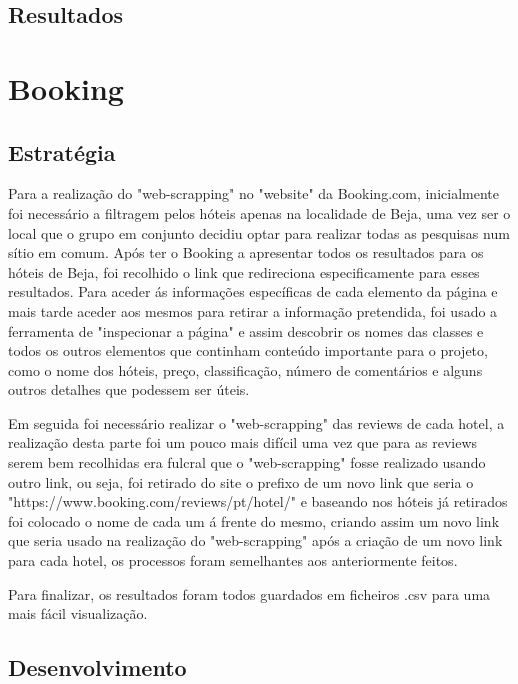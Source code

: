 \documentclass[a4paper,10pt]{article}
\begin{document}
\newpage

\subsection{Resultados}

\newpage

\section{Booking}

\subsection{Estratégia}

Para a realização do "web-scrapping" no "website" da Booking.com, inicialmente foi necessário a filtragem pelos hóteis apenas na localidade de Beja, uma vez ser o local que o grupo em conjunto decidiu optar para realizar todas as pesquisas num sítio em comum. Após ter o Booking a apresentar todos os resultados para os hóteis de Beja, foi recolhido o link que redireciona especificamente para esses resultados. Para aceder ás informações específicas de cada elemento da página e mais tarde aceder aos mesmos para retirar a informação pretendida, foi usado a ferramenta de "inspecionar a página" e assim descobrir os nomes das classes e todos os outros elementos que continham conteúdo importante para o projeto, como o nome dos hóteis, preço, classificação, número de comentários e alguns outros detalhes que podessem ser úteis.

Em seguida foi necessário realizar o "web-scrapping" das reviews de cada hotel, a realização desta parte foi um pouco mais difícil uma vez que para as reviews serem bem recolhidas era fulcral que o "web-scrapping" fosse realizado usando outro link, ou seja, foi retirado do site o prefixo de um novo link que seria o "https://www.booking.com/reviews/pt/hotel/" e baseando nos hóteis já retirados foi colocado o nome de cada um á frente do mesmo, criando assim um novo link que seria usado na realização do "web-scrapping" após a criação de um novo link para cada hotel, os processos foram semelhantes aos anteriormente feitos.

Para finalizar, os resultados foram todos guardados em ficheiros .csv para uma mais fácil visualização.

\subsection{Desenvolvimento}
\end{document}
